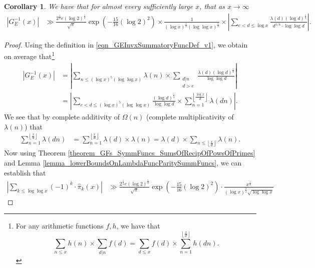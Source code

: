 \documentclass[11pt,reqno,a4letter]{article}
\numberwithin{figure}{section}
\numberwithin{table}{section}
\newcommand{\cf}{\textit{cf.\ }}
\newcommand{\Floor}[2]{\ensuremath{\left\lfloor \frac{#1}{#2} \right\rfloor}}
\theoremstyle{plain}
\newtheorem{cor}[theorem]{Corollary}
\numberwithin{theorem}{section}
\theoremstyle{definition}
\newcommand{\NBRef}[1]{}
\newcommand{\SuccSim}[0]{\overset{_{\scriptsize{\blacktriangle}}}{\succsim}}
\renewcommand{\SuccSim}[0]{\ensuremath{\gg}}
\begin{document}
\begin{cor} 
\label{cor_ASemiForm_ForGInvx_v1} 
We have that for almost every sufficiently large $x$, that as $x \rightarrow \infty$ 
\begin{align*} 
\left\lvert G_E^{-1}(x) \right\rvert & \SuccSim 
     \frac{2^{\frac{1}{4}} e (\log 2)^{\frac{1}{2}}}{\sqrt{\pi}} 
     \exp\left(-\frac{15}{16} (\log 2)^2\right) \times 
     \frac{1}{(\log x)^{\frac{1}{4}} (\log\log x)^{\frac{1}{4}}} \times 
     \left\lvert \sum_{e < d \leq \log x} 
     \frac{\lambda(d) (\log d)^{\frac{1}{4}}}{d^{1/4} \cdot \log\log d} 
     \right\rvert. 
\end{align*} 
\end{cor} 
\NBRef{A10-2020.04-26} 
\begin{proof} 
Using the definition in \eqref{eqn_GEInvxSummatoryFuncDef_v1}, we obtain on average that\footnote{ 
     For any arithmetic functions $f,h$, we have that \cite[\cf \S 3.10; \S 3.12]{APOSTOLANUMT} 
     \[
     \sum_{n \leq x} h(n) \times \sum_{d|n} f(d) = \sum_{d \leq x} f(d) \times \sum_{n=1}^{\Floor{x}{d}} h(dn). 
     \] 
}
\begin{align*} 
\left\lvert G_E^{-1}(x) \right\rvert & = 
     \left\lvert \sum_{n \leq (\log x)^{5} (\log\log x)} \lambda(n) \times 
     \sum_{\substack{d|n \\ d > e}} \frac{\lambda(d) (\log d)^{\frac{1}{4}}}{\log\log d} \right\rvert \\ 
     & = \left\lvert \sum_{e < d \leq (\log x)^{5} (\log\log x)} 
     \frac{(\log d)^{\frac{1}{4}}}{\log\log d} \times 
     \sum_{n=1}^{\Floor{\log x}{d}} \lambda(dn) \right\rvert. 
\end{align*} 
We see that by complete additivity of $\Omega(n)$ 
(complete multiplicativity of $\lambda(n)$) that 
\begin{align*} 
\sum_{n=1}^{\Floor{x}{d}} \lambda(dn) & = \sum_{n=1}^{\Floor{x}{d}} \lambda(d) \times \lambda(n) 
     = \lambda(d) \times \sum_{n \leq \Floor{x}{d}} \lambda(n). 
\end{align*} 
Now using Theorem \ref{theorem_GFs_SymmFuncs_SumsOfRecipOfPowsOfPrimes} and 
Lemma \ref{lemma_lowerBoundsOnLambdaFuncParitySummFuncs}, 
we can establish that 
\begin{align} 
\label{eqn_proof_tag_GEInvxLowerBound_v1} 
\left\lvert \sum_{k \leq \log\log x} (-1)^k \cdot \widehat{\pi}_k(x) \right\rvert 
     & \gg \frac{2^{\frac{1}{4}} e (\log 2)^{\frac{1}{2}}}{\sqrt{\pi}} 
     \exp\left(-\frac{15}{16} (\log 2)^2\right) \cdot 
     \frac{x^{\frac{1}{4}}}{(\log x)^{\frac{3}{2}} \sqrt{\log\log x}} 

\end{align}
\end{proof}
\end{document}
